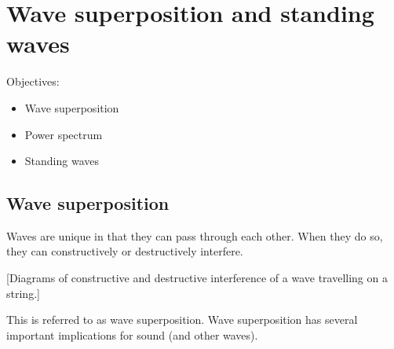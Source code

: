 \section{Wave superposition and standing waves}
Objectives:
\begin{itemize}
\item Wave superposition
\item Power spectrum
\item Standing waves
\end{itemize}

\subsection{Wave superposition}
Waves are unique in that they can pass through each other. When they do so, they can constructively or destructively interfere.

[Diagrams of constructive and destructive interference of a wave travelling on a string.]
\vspace{8cm}

This is referred to as wave superposition. Wave superposition has several important implications for sound (and other waves).

